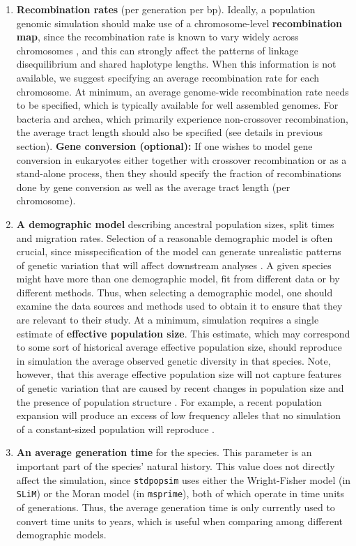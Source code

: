 \documentclass[hidelinks]{article}
\newcommand{\stdpopsim}{\texttt{stdpopsim}\xspace}
\begin{document}
\begin{enumerate}
\item
  \textbf{Recombination rates} (per generation per bp).
  Ideally, a population genomic simulation should make use of a chromosome-level \textbf{recombination map}, 
  since the recombination rate is known to vary widely across chromosomes \citep{Nachman2002},
  and this can strongly affect the patterns of linkage disequilibrium and shared haplotype lengths.
  When this information is not available, we suggest specifying an average recombination rate for each chromosome.
  At minimum, an average genome-wide recombination rate needs to be specified, which is typically available for well assembled genomes.
  For bacteria and archea, which primarily experience non-crossover recombination,
  the average tract length should also be specified
  (see details in previous section).
  \textbf{Gene conversion (optional):} If one wishes to model gene conversion in eukaryotes either together with crossover recombination or as a stand-alone process,
  then they should specify the fraction of recombinations done by gene conversion
  as well as the average tract length (per chromosome).

\item
  \textbf{A demographic model} describing 
  ancestral population sizes, split times and migration rates.
  Selection of a reasonable demographic model is often crucial,
  since misspecification of the model can generate unrealistic patterns of genetic variation that will affect downstream analyses \citep[e.g.,][]{Navascues2009}.
  A given species might have more than one demographic model, fit from different data or by different methods.
  Thus, when selecting a demographic model, one should examine the data sources and methods used to obtain it to ensure that they are relevant to their study.
  At a minimum, simulation requires a single estimate of \textbf{effective population size}. This estimate, which may correspond to some sort of historical average effective population size,
  should reproduce in simulation the average observed genetic diversity in that species. Note, however, that this average effective population size will not capture features of genetic variation that are caused by recent changes in population size and the presence of population structure \citep{MacLeod2013,Eldon2015}.
  For example, a recent population expansion will produce
  an excess of low frequency alleles that no simulation of a constant-sized
  population will reproduce \citep{Tennessen2012}.

\item
  \textbf{An average generation time} for the species.
  This parameter is an important part of the species' natural history.
  This value does not directly affect the simulation, since
  \stdpopsim uses either the Wright-Fisher model (in \texttt{SLiM}) or the Moran model (in \texttt{msprime}),
  both of which operate in time units of generations. 
  Thus, the average generation time is only currently used to convert time units to years, 
  which is useful when comparing among different demographic models.

\end{enumerate}
\end{document}
